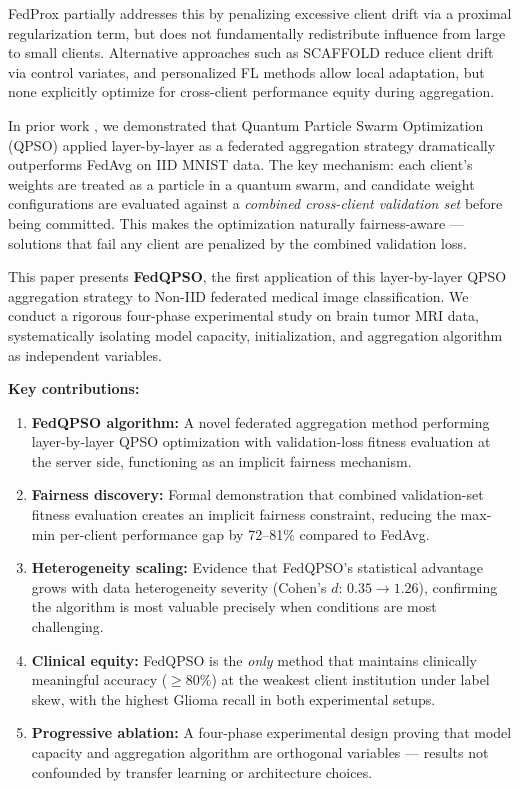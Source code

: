 \documentclass[conference]{IEEEtran}
\begin{document}
FedProx \cite{li2020fedprox} partially addresses this by penalizing excessive
client drift via a proximal regularization term, but does not fundamentally
redistribute influence from large to small clients. Alternative approaches
such as SCAFFOLD \cite{karimireddy2020scaffold} reduce client drift via
control variates, and personalized FL methods \cite{kulkarni2020pfl} allow
local adaptation, but none explicitly optimize for cross-client performance
equity during aggregation.

In prior work \cite{edla2025mnist}, we demonstrated that Quantum Particle
Swarm Optimization (QPSO) \cite{sun2004qpso} applied layer-by-layer as a
federated aggregation strategy dramatically outperforms FedAvg on IID MNIST
data. The key mechanism: each client's weights are treated as a particle in a
quantum swarm, and candidate weight configurations are evaluated against a
\emph{combined cross-client validation set} before being committed. This makes
the optimization naturally fairness-aware --- solutions that fail any client
are penalized by the combined validation loss.

This paper presents \textbf{FedQPSO}, the first application of this
layer-by-layer QPSO aggregation strategy to Non-IID federated medical image
classification. We conduct a rigorous four-phase experimental study on brain
tumor MRI data, systematically isolating model capacity, initialization, and
aggregation algorithm as independent variables.

\textbf{Key contributions:}
\begin{enumerate}
    \item \textbf{FedQPSO algorithm:} A novel federated aggregation method
    performing layer-by-layer QPSO optimization with validation-loss fitness
    evaluation at the server side, functioning as an implicit fairness mechanism.

    \item \textbf{Fairness discovery:} Formal demonstration that combined
    validation-set fitness evaluation creates an implicit fairness constraint,
    reducing the max-min per-client performance gap by 72--81\% compared to
    FedAvg.

    \item \textbf{Heterogeneity scaling:} Evidence that FedQPSO's statistical
    advantage grows with data heterogeneity severity (Cohen's $d$: $0.35
    \to 1.26$), confirming the algorithm is most valuable precisely when
    conditions are most challenging.

    \item \textbf{Clinical equity:} FedQPSO is the \emph{only} method that
    maintains clinically meaningful accuracy ($\geq$80\%) at the weakest
    client institution under label skew, with the highest Glioma recall in
    both experimental setups.

    \item \textbf{Progressive ablation:} A four-phase experimental design
    proving that model capacity and aggregation algorithm are orthogonal
    variables --- results not confounded by transfer learning or architecture
    choices.
\end{enumerate}
\end{document}
